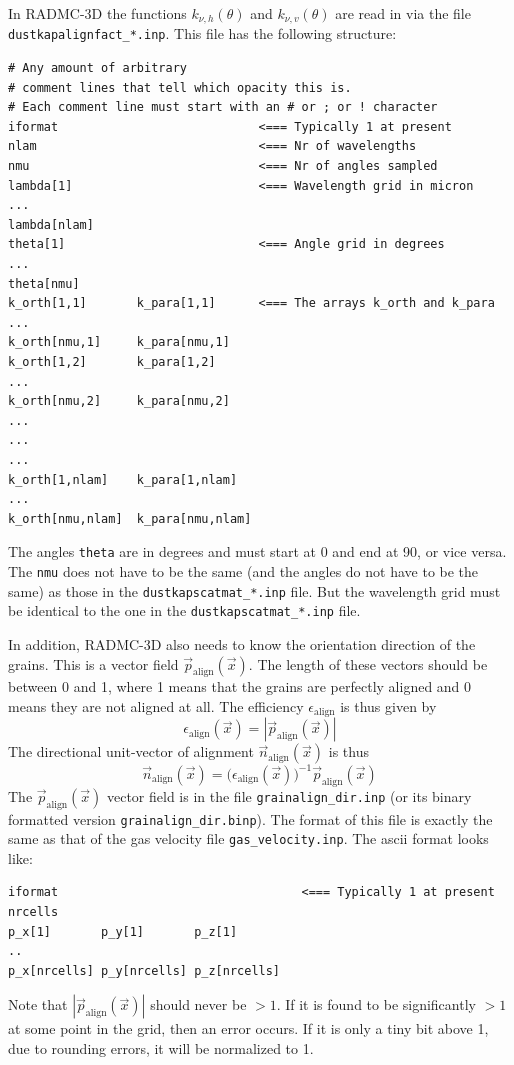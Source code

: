 \documentclass{report}
\begin{document}
In RADMC-3D the functions $k_{\nu,h}(\theta)$ and $k_{\nu,v}(\theta)$
are read in via the file {\small\tt dustkapalignfact\_*.inp}. This file
has the following structure:
{\small\begin{verbatim}
# Any amount of arbitrary
# comment lines that tell which opacity this is.
# Each comment line must start with an # or ; or ! character
iformat                            <=== Typically 1 at present
nlam                               <=== Nr of wavelengths
nmu                                <=== Nr of angles sampled
lambda[1]                          <=== Wavelength grid in micron
...                                           
lambda[nlam]                                  
theta[1]                           <=== Angle grid in degrees
...                                           
theta[nmu]                              
k_orth[1,1]       k_para[1,1]      <=== The arrays k_orth and k_para
...                                            
k_orth[nmu,1]     k_para[nmu,1]               
k_orth[1,2]       k_para[1,2]                 
...
k_orth[nmu,2]     k_para[nmu,2]
...
...
...
k_orth[1,nlam]    k_para[1,nlam]
...
k_orth[nmu,nlam]  k_para[nmu,nlam]
\end{verbatim}}
The angles {\small\tt theta} are in degrees and must start at 0 and end
at 90, or vice versa. 
The {\small\tt nmu} does not have to be the same (and the angles do
not have to be the same) as those in the {\small\tt dustkapscatmat\_*.inp}
file. But the wavelength grid must be identical to the one in 
the {\small\tt dustkapscatmat\_*.inp} file.

In addition, RADMC-3D also needs to know the orientation direction of the
grains. This is a vector field $\vec p_{\mathrm{align}}(\vec x)$. The length
of these vectors should be between 0 and 1, where 1 means that the grains
are perfectly aligned and 0 means they are not aligned at all. The efficiency
$\epsilon_{\mathrm{align}}$ is thus given by
\begin{equation}
\epsilon_{\mathrm{align}}(\vec x) =|\vec p_{\mathrm{align}}(\vec x)|
\end{equation}
The directional unit-vector of alignment $\vec n_{\mathrm{align}}(\vec x)$
is thus
\begin{equation}
\vec n_{\mathrm{align}}(\vec x) = \big(\epsilon_{\mathrm{align}}(\vec x)\big)^{-1}\vec p_{\mathrm{align}}(\vec x)
\end{equation}
The $\vec p_{\mathrm{align}}(\vec x)$ vector field is in
the file {\small\tt grainalign\_dir.inp} (or its binary formatted version
{\small\tt grainalign\_dir.binp}). The format of this file is exactly the
same as that of the gas velocity file {\small\tt gas\_velocity.inp}. The
ascii format looks like:
{\small\begin{verbatim}
iformat                                  <=== Typically 1 at present
nrcells
p_x[1]       p_y[1]       p_z[1]
..
p_x[nrcells] p_y[nrcells] p_z[nrcells]
\end{verbatim}}
Note that $|\vec p_{\mathrm{align}}(\vec x)|$ should never be $>1$. If
it is found to be significantly $>1$ at some point in the grid, then
an error occurs. If it is only a tiny bit above 1, due to rounding
errors, it will be normalized to 1. 
\end{document}
